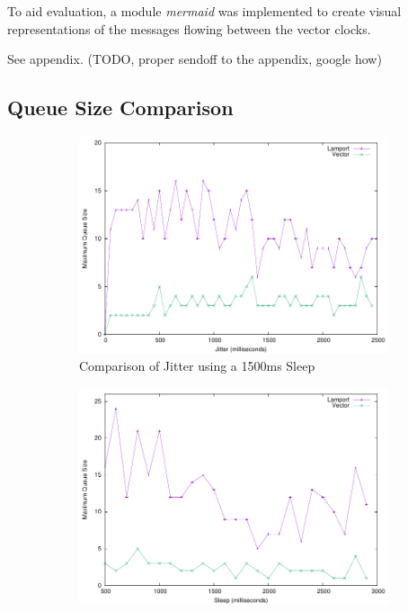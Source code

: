 \documentclass[a4paper, 11pt]{article}
\begin{document}
To aid evaluation, a module \textit{mermaid} was implemented to create visual representations of the messages flowing between the vector clocks.

See appendix. (TODO, proper sendoff to the appendix, google how)

\subsection{Queue Size Comparison}



\begin{figure}[H]
  \begin{center}
    \begin{subfigure}[b]{0.494\textwidth}
      \centering
      \includegraphics[width=\textwidth]{test/jitter.pdf}
      \caption{Comparison of Jitter using a 1500ms Sleep}
      \label{fig:results1}
    \end{subfigure}
    \hfill
    \begin{subfigure}[b]{0.494\textwidth}
      \centering
      \includegraphics[width=\textwidth]{test/sleep.pdf}

\end{subfigure}
\end{center}
\end{figure}
\end{document}
